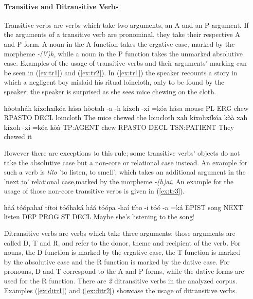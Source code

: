 \documentclass[a4paper, 12pt, oneside]{memoir}
\newcommand{\emh}[1]{\textit{#1}}
\begin{document}
\paragraph{Transitive and Ditransitive Verbs}\label{s:trans}
Transitive verbs are verbs which take two arguments, an A and an P argument. If the arguments of a transitive verb are pronominal, they take their respective A and P form. A noun in the A function takes the ergative case, marked by the morpheme \emh{-(V́)h}, while a noun in the P function takes the unmarked absolutive case. Examples of the usage of transitive verbs and their arguments' marking can be seen in (\ref{ex:tr1}) and (\ref{ex:tr2}). In (\ref{ex:tr1}) the speaker recounts a story in which a negligent boy mislaid his ritual loincloth, only to be found by the speaker; the speaker is surprised as she sees mice chewing on the cloth.
\begin{examples}
    \ex \label{ex:tr1}
    \words hòotaháh kíxohxíkóa hása
    \bits hòotah -a -h kíxoh -xí =kóa hása 
    \gloss mouse PL ERG chew RPASTO DECL loincloth
    \tr The mice chewed the loincloth
    \ex \label{ex:tr2}
    \words xah kíxohxíkóa kòà
    \bits xah kíxoh -xí =kóa kòà
    \gloss TP:AGENT chew RPASTO DECL TSN:PATIENT
    \tr They chewed it
\end{examples} 
However there are exceptions to this rule; some transitive verbs' objects do not take the absolutive case but a non-core or relational case instead. An example for such a verb is \emh{títo} 'to listen, to smell', which takes an additional argument in the 'next to' relational case,marked by the morpheme \emh{-(h)aí}. An example for the usage of those non-core transitive verbs is given in (\ref{ex:tr3}).
\begin{examples}
    \ex \label{ex:tr3}
    \words háá tóópahaí títoi tóóhaká
    \bits háá tóópa -haí títo -i tóó -a =ká 
    \gloss EPIST song NEXT listen DEP PROG ST DECL
    \tr Maybe she's listening to the song!
\end{examples}
Ditransitive verbs are verbs which take three arguments; those arguments are called D, T and R, and refer to the donor, theme and recipient of the verb. For nouns, the D function is marked by the ergative case, the T function is marked by the absolutive case and the R function is marked by the dative case. For pronouns, D and T correspond to the A and P forms, while the dative forms are used for the R function. There are \textit{2} ditransitive verbs in the analyzed corpus. Examples (\ref{ex:ditr1}) and (\ref{ex:ditr2}) showcase the usage of ditransitive verbs. 
\end{document}
